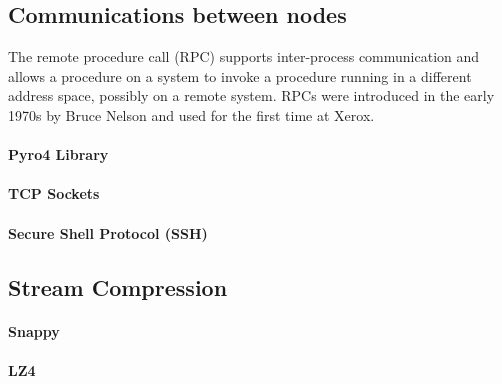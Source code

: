\subsection{Communications between nodes}
\label{sub:rep_comms}

The remote procedure call (RPC) supports inter-process communication and allows a procedure on a system to invoke a procedure running in a different address space, possibly on a remote system. RPCs were introduced in the early 1970s by Bruce Nelson and used for the first time at Xerox.


\paragraph{Pyro4 Library}
\label{par:rep_pyro4}



\paragraph{TCP Sockets}
\label{par:rep_tcp_sockets}

\paragraph{Secure Shell Protocol (SSH)}
\label{par:rep_ssh}


\subsection{Stream Compression}
\label{sub:rep_stream_compression}

\paragraph{Snappy}
\label{par:rep_snappy}

\paragraph{LZ4}
\label{par:rep_lz4}


